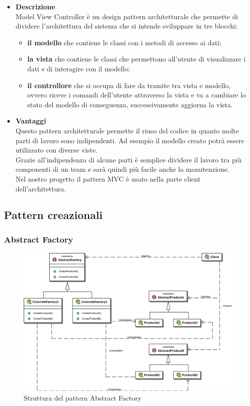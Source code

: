 		\begin{itemize}	
			\item \textbf{Descrizione} \\ Model View Controller è un design pattern architetturale che permette di dividere l'architettura del sistema che si intende sviluppare in tre blocchi:
			\begin{itemize}
				\item \textbf{il modello} che contiene le classi con i metodi di accesso ai dati;
				\item \textbf{la vista} che contiene le classi che permettono all'utente di visualizzare i dati e di interagire con il modello;
				\item \textbf{il controllore} che si occupa di fare da tramite tra vista e modello, ovvero riceve i comandi dell'utente attraverso la vista e va a cambiare lo stato del modello di conseguenza, successivamente aggiorna la vista.				
			\end{itemize}
			
			\item \textbf{Vantaggi} \\
			Questo pattern architetturale permette il riuso del codice in quanto molte parti di lavoro sono indipendenti. Ad esempio il modello creato potrà essere utilizzato con diverse viste. \\ Grazie all'indipendenza di alcune parti è semplice dividere il lavoro tra più componenti di un team e sarà quindi più facile anche la manutenzione.
			\utilizzo \\
			Nel nostro progetto il pattern MVC è usato nella parte client dell'architettura. 
		\end{itemize}
		
\subsection{Pattern creazionali}
	\subsubsection{Abstract Factory}
	
	\begin{figure}[!h]
		\centering
		\includegraphics[scale=0.2]{img/abstract_factory}  
		\caption{Struttura del pattern Abstract Factory}
	\end{figure}
	
